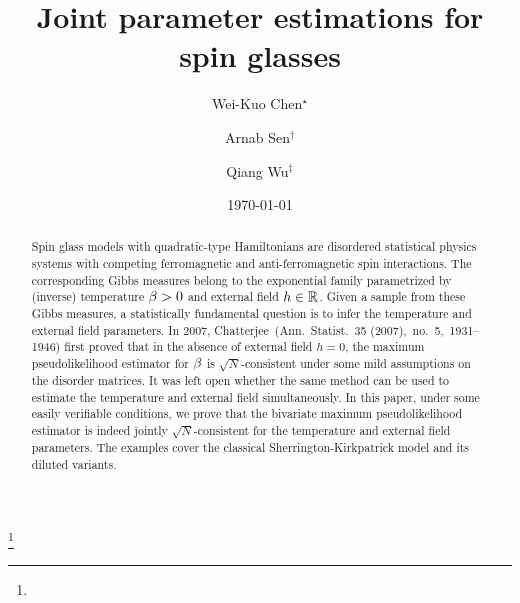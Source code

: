 \documentclass[letterpaper,11pt,reqno]{amsart}
\begin{document}
\title[Joint estimations for spin glasses]{Joint parameter estimations for spin glasses}
\author[Chen]{Wei-Kuo Chen$^\star$}
\author[Sen]{Arnab Sen$^\dagger$}
\author[Wu]{Qiang Wu$^\ddagger$}
\address{School of Mathematics, University of Minnesota, 127 Vincent Hall 206 Church St. SE Minneapolis, MN 55455}
\date{\today}
\thanks{}
\begin{abstract}
	Spin glass models with quadratic-type Hamiltonians are disordered statistical physics systems with competing ferromagnetic and anti-ferromagnetic spin interactions. The corresponding Gibbs measures belong to the exponential family parametrized by (inverse) temperature $\beta>0$ and external field $h\in\mathbb{R}$. Given a sample from these Gibbs measures, a statistically fundamental question is to infer the temperature and external field parameters.
 In 2007, Chatterjee~(Ann.~Statist.~35 (2007),~no.~5,~1931–1946) first proved that in the absence of external field $h=0$, the maximum pseudolikelihood estimator for $\beta$ is $\sqrt{N}$-consistent under some mild assumptions on the disorder matrices. 
 It was left open whether the same method can be used to estimate the temperature and external field simultaneously. %
 In this paper, under some easily verifiable conditions, we prove that the bivariate maximum pseudolikelihood estimator is indeed jointly $\sqrt{N}$-consistent for the temperature and external field parameters. The examples cover the classical Sherrington-Kirkpatrick model and its diluted variants. 
 

\end{abstract}

\maketitle
\end{document}
